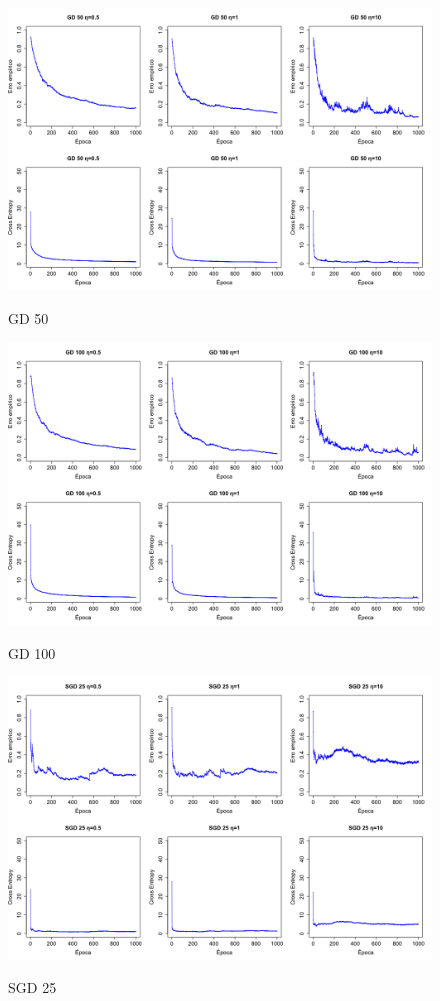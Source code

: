 \documentclass{report}
\begin{document}
\begin{figure}
  \includegraphics[width=\linewidth]{gd_50.png}
  \label{fig:gd_50}
  \caption{GD 50}
\end{figure}

\begin{figure}
  \includegraphics[width=\linewidth]{gd_100.png}
  \label{fig:gd_100}
  \caption{GD 100}
\end{figure}

\begin{figure}
  \includegraphics[width=\linewidth]{sgd_25.png}
  \label{fig:sgd_25}
  \caption{SGD 25}
\end{figure}
\end{document}
